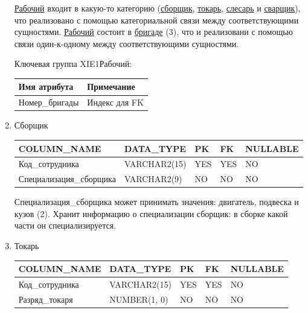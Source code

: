 \begin{enumerate}
\begin{tabular}{|p{7cm}|p{3cm}|p{1cm}|p{1cm}|p{3cm}|}
    \end{tabular}

    \underline{Рабочий} входит в какую-то категорию (\underline{сборщик}, \underline{токарь}, \underline{слесарь} и \underline{сварщик}), что реализовано с помощью категориальной связи между соответствующими сущностями.
    \underline{Рабочий} состоит в \underline{бригаде} (3), что и реализовани с помощью связи один-к-одному между соответствующими сущностями.

    Ключевая группа XIE1Рабочий:

    \begin{tabular}{|p{7cm}|p{9.3cm}|} \hline

        {\bf Имя атрибута} & {\bf Примечание} \\ \hline
        Номер\_бригады & Индекс для FK \\ \hline

    \end{tabular}

    \item{Сборщик}

    \begin{tabular}{|p{7cm}|p{3cm}|p{1cm}|p{1cm}|p{3cm}|} \hline

        {\bf COLUMN\_NAME} & {\bf DATA\_TYPE} & {\bf PK} & {\bf FK} & {\bf NULLABLE} \\ \hline
        Код\_сотрудника & VARCHAR2(15) & YES & YES & NO \\ \hline
        Специализация\_сборщика & VARCHAR2(9) & NO & NO & NO \\ \hline

    \end{tabular}

    Специализация\_сборщика может принимать значения: двигатель, подвеска и кузов (2).
    Хранит информацию о специализации сборщик: в сборке какой части он специализируется.

    \item{Токарь}

    \begin{tabular}{|p{7cm}|p{3cm}|p{1cm}|p{1cm}|p{3cm}|} \hline

        {\bf COLUMN\_NAME} & {\bf DATA\_TYPE} & {\bf PK} & {\bf FK} & {\bf NULLABLE} \\ \hline
        Код\_сотрудника & VARCHAR2(15) & YES & YES & NO \\ \hline
        Разряд\_токаря & NUMBER(1, 0) & NO & NO & NO \\ \hline


\end{tabular}
\end{enumerate}
